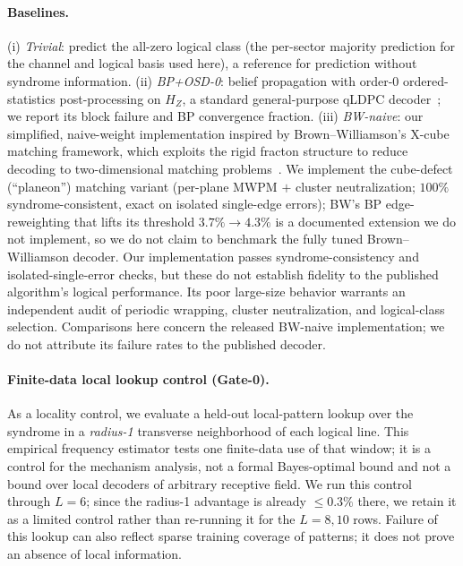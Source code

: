\documentclass[11pt,a4paper]{article}
\begin{document}
\paragraph{Baselines.} (i) \emph{Trivial}: predict the all-zero logical
class (the per-sector majority prediction for the channel and logical basis
used here), a reference for prediction without syndrome information. (ii) \emph{BP+OSD-0}: belief
propagation with order-0 ordered-statistics post-processing on $H_Z$, a standard
general-purpose qLDPC decoder~\cite{spencer2026tutorial}; we report its block
failure and BP convergence fraction. (iii) \emph{BW-naive}: our simplified, naive-weight
implementation inspired by Brown--Williamson's X-cube matching framework, which exploits
the rigid fracton structure to reduce decoding to two-dimensional matching
problems~\cite{brown2019}. We implement the cube-defect (``planeon'') matching
variant (per-plane MWPM $+$ cluster neutralization; $100\%$ syndrome-consistent,
exact on isolated single-edge errors); BW's BP edge-reweighting that lifts its
threshold $3.7\%\!\to\!4.3\%$ is a documented extension we do not implement, so
we do not claim to benchmark the fully tuned Brown--Williamson decoder. Our implementation passes syndrome-consistency and isolated-single-error
checks, but these do not establish fidelity to the published algorithm's
logical performance. Its poor large-size behavior warrants an independent
audit of periodic wrapping, cluster neutralization, and logical-class
selection. Comparisons here concern the released BW-naive implementation;
we do not attribute its failure rates to the published decoder.

\paragraph{Finite-data local lookup control (Gate-0).} As a locality control, we
evaluate a held-out local-pattern lookup over the syndrome in a
\emph{radius-1} transverse neighborhood of each logical line. This empirical
frequency estimator tests one finite-data use of that window; it is a control for the mechanism analysis, not a formal
Bayes-optimal bound and not a bound over local decoders of arbitrary receptive
field. We run this control through $L=6$; since the radius-1 advantage is already
$\le 0.3\%$ there, we retain it as a limited control rather than re-running it for
the $L=8,10$ rows. Failure of this lookup can also reflect sparse training
coverage of patterns; it does not prove an absence of local information.
\end{document}
